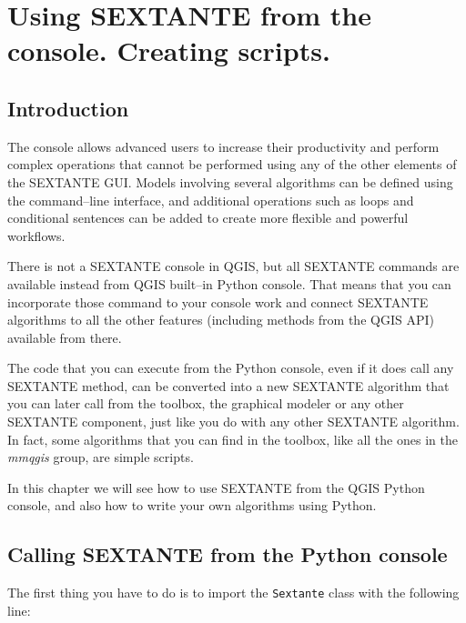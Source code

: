 \chapter{Using SEXTANTE from the console. Creating scripts.}

\section{Introduction}

The console allows advanced users to increase their productivity and perform complex operations that cannot be performed using any of the other elements of the SEXTANTE GUI. Models involving several algorithms can be defined using the command--line interface, and additional operations such as loops and conditional sentences can be added to create more flexible and powerful workflows.

There is not a SEXTANTE console in QGIS, but all SEXTANTE commands are available instead from QGIS built--in Python console. That means that you can incorporate those command to your console work and connect SEXTANTE algorithms to all the other features (including methods from the QGIS API) available from there.

The code that you can execute from the Python console, even if it does call any SEXTANTE method, can be converted into a new  SEXTANTE algorithm that you can later call from the toolbox, the graphical modeler or any other SEXTANTE component, just like you do with any other SEXTANTE algorithm. In fact, some algorithms that you can find in the toolbox, like all the ones in the \emph{mmqgis} group, are simple scripts.

In this chapter we will see how to use SEXTANTE from the QGIS Python console, and also how to write your own algorithms using Python.


\section{Calling SEXTANTE from the Python console}

The first thing you have to do is to import the \texttt{Sextante} class with the following line:

